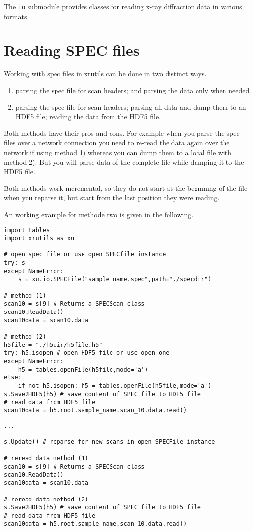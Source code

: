 
The {\tt io} submodule provides classes for reading x-ray diffraction data in
various formats. 

\section{Reading SPEC files}

Working with spec files in xrutils can be done in two distinct ways. 
\begin{enumerate}
 \item parsing the spec file for scan headers; and parsing the data only when needed
 \item parsing the spec file for scan headers; parsing all data and dump them to an HDF5 file; reading the data from the HDF5 file. 
\end{enumerate}
Both methods have their pros and cons. For example when you parse the spec-files over a network connection you need to re-read the data again over the network if using method 1) whereas you can dump them to a local file with method 2). But you will parse data of the complete file while dumping it to the HDF5 file. 

Both methods work incremental, so they do not start at the beginning of the file when you reparse it, but start from the last position they were reading.

An working example for methode two is given in the following.

\begin{lstlisting}[caption=parsing a SPEC file and read data (1) or dumping the data to an HDF5 file (2)]
import tables
import xrutils as xu

# open spec file or use open SPECfile instance
try: s
except NameError:
    s = xu.io.SPECFile("sample_name.spec",path="./specdir")

# method (1)
scan10 = s[9] # Returns a SPECScan class
scan10.ReadData()
scan10data = scan10.data

# method (2)
h5file = "./h5dir/h5file.h5"
try: h5.isopen # open HDF5 file or use open one
except NameError:
    h5 = tables.openFile(h5file,mode='a')
else:
    if not h5.isopen: h5 = tables.openFile(h5file,mode='a')
s.Save2HDF5(h5) # save content of SPEC file to HDF5 file
# read data from HDF5 file
scan10data = h5.root.sample_name.scan_10.data.read()
\end{lstlisting}

\begin{lstlisting}[caption=reparse the SPEC file for new scans and reread the scans (1) or update the HDF5 file(2)]
...

s.Update() # reparse for new scans in open SPECFile instance

# reread data method (1)
scan10 = s[9] # Returns a SPECScan class
scan10.ReadData()
scan10data = scan10.data 

# reread data method (2)
s.Save2HDF5(h5) # save content of SPEC file to HDF5 file
# read data from HDF5 file
scan10data = h5.root.sample_name.scan_10.data.read()
\end{lstlisting}

